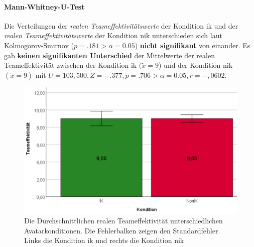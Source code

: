 \documentclass[a4paper,11pt]{article}%
\renewcommand{\\}{\vspace*{0.5\baselineskip} \newline}
\begin{document}
\paragraph{Mann-Whitney-U-Test}
Die Verteilungen der \textit{realen Teameffektivitätswerte} der Kondition \ac{ik} und der \textit{realen Teameffektivitätswerte} der Kondition \ac{nik} unterschieden sich laut Kolmogorov-Smirnov ($p = .181 > \alpha = 0.05$) \textbf{nicht signifikant} von einander. Es gab \textbf{keinen signifikanten Unterschied} der Mittelwerte der realen Teameffektivität zwischen der Kondition \ac{ik} $(\tilde x = 9$) und der Kondition \ac{nik} $(\tilde x = 9)$ mit $U = 103,500, Z = -.377, p = .706 > \alpha = 0.05, r = -,0602$. \\

	\begin{figure}[H]
		\begin{footnotesize}
		\centering
			\includegraphics[scale=0.3]{Abbildungen/AuswertungDiagramme/H4_Mittelwerte.png}	
			\caption[Mittelwerte und der Standardfehler der realen Teameffektivität]{Die Durchschnittlichen realen Teameffektivität unterschiedlichen Avatarkonditionen. Die Fehlerbalken zeigen den Standardfehler. Links die Kondition \ac{ik} und rechts die Kondition \ac{nik}}
			\label{H4_Mittelwerte_Auswertung}
		\end{footnotesize}
	\end{figure}

\end{document}
